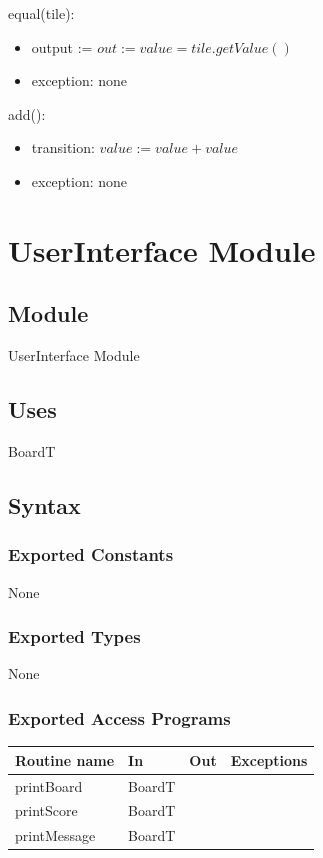 \documentclass[12pt]{article}
\begin{document}
\noindent equal(tile):
\begin{itemize}
\item output := $out := value = tile.getValue()$
\item exception: none
\end{itemize}

\noindent add():
\begin{itemize}
\item transition: $value := value + value$
\item exception: none
\end{itemize}

\newpage



\newpage

\section* {UserInterface Module}

\subsection*{Module}
UserInterface Module

\subsection* {Uses}

BoardT

\subsection* {Syntax}

\subsubsection* {Exported Constants}

None

\subsubsection* {Exported Types}

None

\subsubsection* {Exported Access Programs}

\begin{tabular}{| l | l | l | p{5cm} |}
  \hline
  \textbf{Routine name} & \textbf{In} & \textbf{Out} & \textbf{Exceptions}\\
  \hline
  printBoard & BoardT & & \\
  \hline
  printScore & BoardT & & ~\\
  \hline
  printMessage & BoardT & & ~\\
  \hline
  
\end{tabular}
\end{document}
